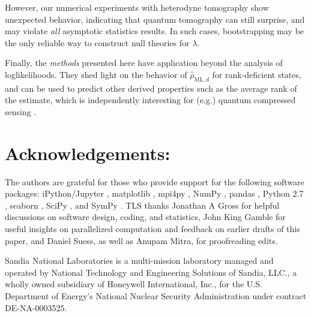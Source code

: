\documentclass[aps,pra, twocolumn]{revtex4-1}
\newcommand{\rhohat}{\hat{\rho}}
\newcommand{\rhoML}[1]{\rhohat_{\scriptscriptstyle{\mathrm{ML},#1}}}
\begin{document}
However, our numerical experiments with heterodyne tomography show unexpected behavior, indicating that quantum tomography can still surprise, and may violate \emph{all} asymptotic statistics results.  In such cases, bootstrapping \cite{Efron1979, Higgins2004} may be the only reliable way to construct null theories for $\lambda$. 

Finally, the \emph{methods} presented here have application beyond the analysis of loglikelihoods.  They shed light on the behavior of $\rhoML{d}$ for rank-deficient states, and can be used to predict other derived properties such as the average rank of the estimate, which is independently interesting for (e.g.) quantum compressed sensing \cite{Flammia2012a, Steffens2016, Kalev2015, Kalev2015a}.

\section{Acknowledgements:} The authors are grateful for those who provide support for the following software packages: iPython/Jupyter \cite{Perez}, matplotlib
\cite{Hunter2007}, mpi4py \cite{Dalcin2011},  NumPy \cite{VanDerWalt2011}, pandas \cite{mckinney2010}, Python 2.7 
\cite{vanRossum}, seaborn \cite{Waskom2016}, SciPy \cite{Oliphant2007a}, and SymPy \cite{Meurer2017}. TLS thanks Jonathan A Gross for helpful discussions on software design, coding, and statistics, John King Gamble for useful insights on parallelized
computation and feedback on earlier drafts of this paper, and Daniel Suess, as well as Anupam Mitra, for proofreading edits.

Sandia National Laboratories is a multi-mission laboratory managed and operated by National Technology and Engineering Solutions of Sandia, LLC., a wholly owned subsidiary of Honeywell International, Inc., for the U.S. Department of Energy's National Nuclear Security Administration under contract DE-NA-0003525.



\end{document}
